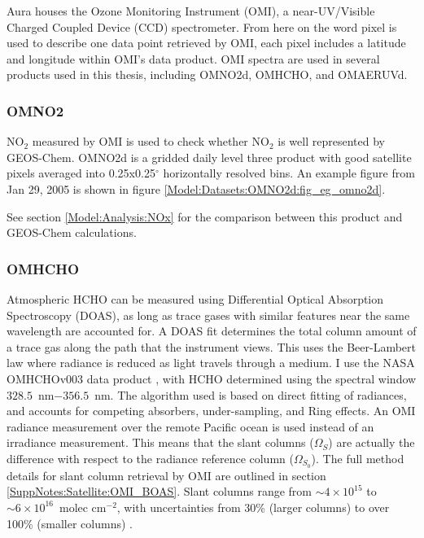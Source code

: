     Aura houses the Ozone Monitoring Instrument (OMI), a near-UV/Visible Charged Coupled Device (CCD) spectrometer.
    From here on the word pixel is used to describe one data point retrieved by OMI, each pixel includes a latitude and longitude within OMI's data product.
    OMI spectra are used in several products used in this thesis, including OMNO2d, OMHCHO, and OMAERUVd.
    
    
    \subsubsection{OMNO2}
      \label{Model:Datasets:OMNO2d}
      NO$_2$ measured by OMI is used to check whether NO$_2$ is well represented by GEOS-Chem. 
      OMNO2d is a gridded daily level three product with good satellite pixels averaged into 0.25x0.25$^{\circ}$ horizontally resolved bins.
      An example figure from Jan 29, 2005 is shown in figure \ref{Model:Datasets:OMNO2d:fig_eg_omno2d}.
      
      
      
      See section \ref{Model:Analysis:NOx} for the comparison between this product and GEOS-Chem calculations.
    
    \subsubsection{OMHCHO}
      \label{Model:Datasets:OMHCHO}
      
      Atmospheric HCHO can be measured using Differential Optical Absorption Spectroscopy (DOAS), as long as trace gases with similar features near the same wavelength are accounted for.
      A DOAS fit determines the total column amount of a trace gas along the path that the instrument views.
      This uses the Beer-Lambert law where radiance is reduced as light travels through a medium.
      I use the NASA OMHCHOv003 data product \parencite{Abad2015}, with HCHO determined using the spectral window $328.5$~nm$ - 356.5$~nm. 
      The algorithm used is based on direct fitting of radiances, and accounts for competing absorbers, under-sampling, and Ring effects.
      An OMI radiance measurement over the remote Pacific ocean is used instead of an irradiance measurement.
      This means that the slant columns ($\Omega_S$) are actually the difference with respect to the radiance reference column ($\Omega_{S_0}$).
      The full method details for slant column retrieval by OMI are outlined in section \ref{SuppNotes:Satellite:OMI_BOAS}.
      Slant columns range from $\sim 4\times 10^{15} $ to $\sim 6 \times 10^{16}$~molec cm$^{-2}$, with uncertainties from 30\% (larger columns) to over 100\% (smaller columns) \parencite{Abad2015}.
      
